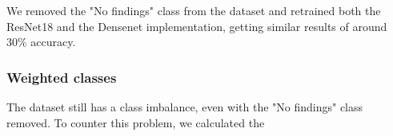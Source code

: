 We removed the "No findings" class from the dataset and retrained both the ResNet18 and the Densenet implementation, getting similar results of around 30\% accuracy.

\subsubsection{Weighted classes}
The dataset still has a class imbalance, even with the "No findings" class removed. To counter this problem, we calculated the 